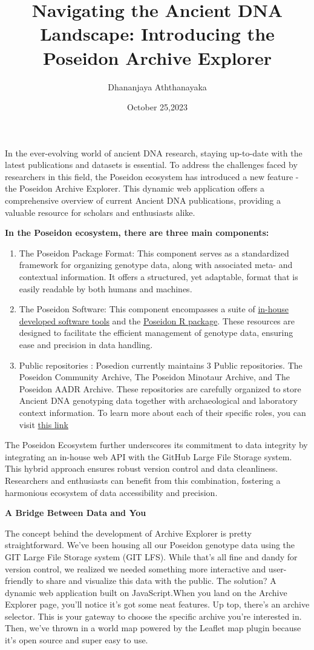 \documentclass[a4paper]{article}
\title{Navigating the Ancient DNA Landscape: Introducing the Poseidon Archive Explorer}
\author{Dhananjaya Aththanayaka}
\date{October 25,2023}
\begin{document}
\maketitle
\raggedright
In the ever-evolving world of ancient DNA research, staying up-to-date with the latest publications and datasets is essential. To address the challenges faced by researchers in this field, the Poseidon ecosystem has introduced a new feature - the Poseidon Archive Explorer. This dynamic web application offers a comprehensive overview of current Ancient DNA publications, providing a valuable resource for scholars and enthusiasts alike.

\textbf{In the Poseidon ecosystem, there are three main components: }

\begin{enumerate}
    \item The Poseidon Package Format: This component serves as a standardized framework for organizing genotype data, along with associated meta- and contextual information. It offers a structured, yet adaptable, format that is easily readable by both humans and machines.
  \item The Poseidon Software: This component encompasses a suite of \href{https://www.poseidon-adna.org/#/trident}{in-house developed software tools} and the \href{https://www.poseidon-adna.org/#/janno_r_package}{Poseidon R package}. These resources are designed to facilitate the efficient management of genotype data, ensuring ease and precision in data handling.
  \item Public repositories : Posedion currently maintains 3 Public repositories. The Poseidon Community Archive, The Poseidon Minotaur Archive, and The Poseidon AADR Archive. These repositories are carefully organized to store Ancient DNA genotyping data together with archaeological and laboratory context information. To learn more about each of their specific roles, you can visit \href{https://www.poseidon-adna.org/#/archive_overview}{this link}
\end{enumerate}
The Poseidon Ecosystem further underscores its commitment to data integrity by integrating an in-house web API with the GitHub Large File Storage system. This hybrid approach ensures robust version control and data cleanliness. Researchers and enthusiasts can benefit from this combination, fostering a harmonious ecosystem of data accessibility and precision.

\textbf{A Bridge Between Data and You}

The concept behind the development of Archive Explorer is pretty straightforward. We've been housing all our Poseidon genotype data using the GIT Large File Storage system (GIT LFS). While that's all fine and dandy for version control, we realized we needed something more interactive and user-friendly to share and visualize this data with the public. The solution? A dynamic web application built on JavaScript.When you land on the Archive Explorer page, you'll notice it's got some neat features. Up top, there's an archive selector. This is your gateway to choose the specific archive you're interested in. Then, we've thrown in a world map powered by the Leaflet map plugin because it's open source and super easy to use.
\end{document}

